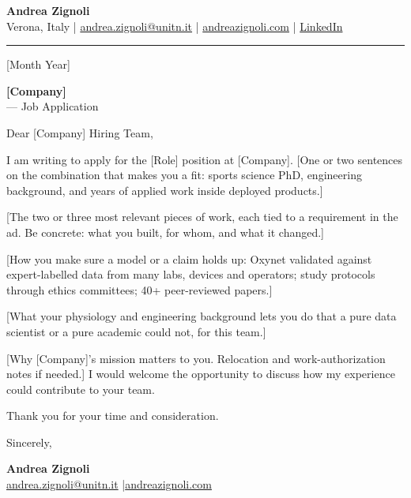 \documentclass[10pt,a4paper]{article}
\newcommand{\company}{[Company]}
\newcommand{\role}{[Role]}
\begin{document}
{\LARGE\bfseries Andrea Zignoli}\\[3pt]
{\small
  Verona, Italy \quad|\quad
  \href{mailto:andrea.zignoli@unitn.it}{andrea.zignoli@unitn.it} \quad|\quad
  \href{https://andreazignoli.com}{andreazignoli.com} \quad|\quad
  \href{https://linkedin.com/in/andrea-zignoli-8080a438}{LinkedIn}
}

\vspace{10pt}
\rule{\linewidth}{0.5pt}
\vspace{6pt}

[Month Year]

\textbf{\company}\\
\role{} — Job Application

\vspace{6pt}

Dear \company{} Hiring Team,

I am writing to apply for the \role{} position at \company. [One or two sentences on the combination that makes you a fit: sports science PhD, engineering background, and years of applied work inside deployed products.]

[The two or three most relevant pieces of work, each tied to a requirement in the ad. Be concrete: what you built, for whom, and what it changed.]

[How you make sure a model or a claim holds up: Oxynet validated against expert-labelled data from many labs, devices and operators; study protocols through ethics committees; 40+ peer-reviewed papers.]

[What your physiology and engineering background lets you do that a pure data scientist or a pure academic could not, for this team.]

[Why \company's mission matters to you. Relocation and work-authorization notes if needed.] I would welcome the opportunity to discuss how my experience could contribute to your team.

Thank you for your time and consideration.

\vspace{16pt}
Sincerely,

\vspace{8pt}
\textbf{Andrea Zignoli}\\
\href{mailto:andrea.zignoli@unitn.it}{andrea.zignoli@unitn.it} \quad|\quad \href{https://andreazignoli.com}{andreazignoli.com}
\end{document}
